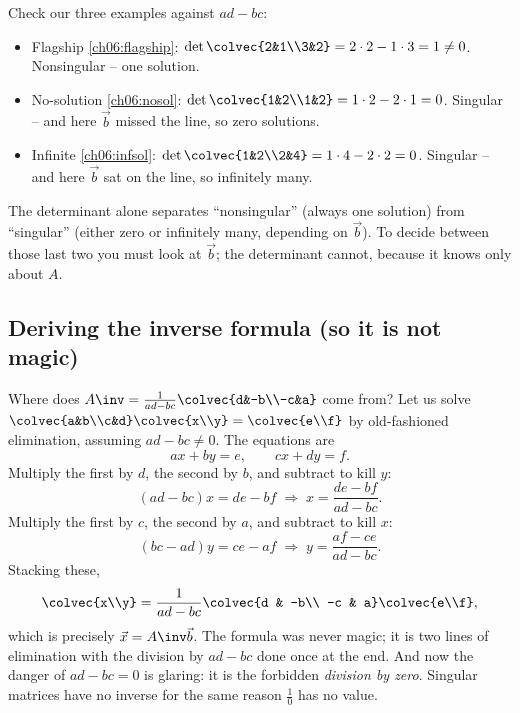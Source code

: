 Check our three examples against $ad-bc$:
\begin{itemize}
  \item Flagship \eqref{ch06:flagship}: $\det\colvec{2&1\\3&2}=2\cdot2-1\cdot3=1\neq0$.
  Nonsingular -- one solution. \checkmark
  \item No-solution \eqref{ch06:nosol}: $\det\colvec{1&2\\1&2}=1\cdot2-2\cdot1=0$.
  Singular -- and here $\vec b$ missed the line, so zero solutions.
  \item Infinite \eqref{ch06:infsol}: $\det\colvec{1&2\\2&4}=1\cdot4-2\cdot2=0$.
  Singular -- and here $\vec b$ sat on the line, so infinitely many.
\end{itemize}
The determinant alone separates ``nonsingular'' (always one solution) from
``singular'' (either zero or infinitely many, depending on $\vec b$). To
decide between those last two you must look at $\vec b$; the determinant
cannot, because it knows only about $A$.

\subsection{Deriving the inverse formula (so it is not magic)}

Where does $A\inv=\frac{1}{ad-bc}\colvec{d&-b\\-c&a}$ come from? Let us solve
$\colvec{a&b\\c&d}\colvec{x\\y}=\colvec{e\\f}$ by old-fashioned elimination,
assuming $ad-bc\neq0$. The equations are
\[
  ax+by=e,\qquad cx+dy=f.
\]
Multiply the first by $d$, the second by $b$, and subtract to kill $y$:
\[
  (ad-bc)x = de - bf \;\Longrightarrow\; x=\frac{de-bf}{ad-bc}.
\]
Multiply the first by $c$, the second by $a$, and subtract to kill $x$:
\[
  (bc-ad)y = ce - af \;\Longrightarrow\; y=\frac{af-ce}{ad-bc}.
\]
Stacking these,
\[
  \colvec{x\\y}=\frac{1}{ad-bc}\colvec{d & -b\\ -c & a}\colvec{e\\f},
\]
which is precisely $\vec x=A\inv\vec b$. The formula was never magic; it is
two lines of elimination with the division by $ad-bc$ done once at the end.
And now the danger of $ad-bc=0$ is glaring: it is the forbidden
\emph{division by zero}. Singular matrices have no inverse for the same
reason $\tfrac10$ has no value.

